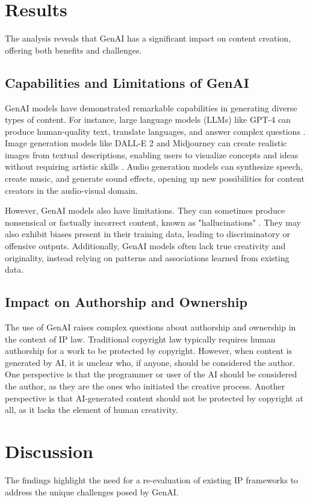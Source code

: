 \documentclass[12pt,a4paper]{article}
\begin{document}
\section{Results}
The analysis reveals that GenAI has a significant impact on content creation, offering both benefits and challenges.

\subsection{Capabilities and Limitations of GenAI}
GenAI models have demonstrated remarkable capabilities in generating diverse types of content. For instance, large language models (LLMs) like GPT-4 can produce human-quality text, translate languages, and answer complex questions \citep{brown2020language}. Image generation models like DALL-E 2 and Midjourney can create realistic images from textual descriptions, enabling users to visualize concepts and ideas without requiring artistic skills \citep{ramesh2022hierarchical}. Audio generation models can synthesize speech, create music, and generate sound effects, opening up new possibilities for content creators in the audio-visual domain.

However, GenAI models also have limitations. They can sometimes produce nonsensical or factually incorrect content, known as "hallucinations" \citep{ji2023survey}. They may also exhibit biases present in their training data, leading to discriminatory or offensive outputs. Additionally, GenAI models often lack true creativity and originality, instead relying on patterns and associations learned from existing data.

\subsection{Impact on Authorship and Ownership}
The use of GenAI raises complex questions about authorship and ownership in the context of IP law. Traditional copyright law typically requires human authorship for a work to be protected by copyright. However, when content is generated by AI, it is unclear who, if anyone, should be considered the author. One perspective is that the programmer or user of the AI should be considered the author, as they are the ones who initiated the creative process. Another perspective is that AI-generated content should not be protected by copyright at all, as it lacks the element of human creativity.

\section{Discussion}
The findings highlight the need for a re-evaluation of existing IP frameworks to address the unique challenges posed by GenAI.
\end{document}
